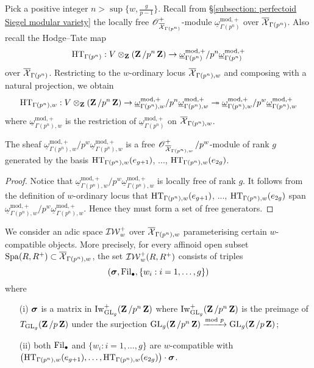 Pick a positive integer $n>\sup\{w, \frac{g}{p-1}\}$. Recall from \S \ref{subsection: perfectoid Siegel modular variety} the locally free $\operatorname{\mathscr{O}}^+_{\overline{\operatorname{\mathcal{X}}}_{\Gamma(p^n)}}$-module $\underline{\omega}^{\mathrm{mod},+}_{\Gamma(p^n)}$ over $\overline{\operatorname{\mathcal{X}}}_{\Gamma(p^n)}$. Also recall the Hodge--Tate map
$$\operatorname{HT}_{\Gamma(p^n)}:V\otimes_{\operatorname{\mathbf{Z}}}(\operatorname{\mathbf{Z}}/p^n\operatorname{\mathbf{Z}})\rightarrow \underline{\omega}^{\mathrm{mod}, +}_{\Gamma(p^n)}/p^n\underline{\omega}^{\mathrm{mod}, +}_{\Gamma(p^n)}$$
over $\overline{\operatorname{\mathcal{X}}}_{\Gamma(p^n)}$. Restricting to the $w$-ordinary locus $\overline{\operatorname{\mathcal{X}}}_{\Gamma(p^n),w}$ and composing with a natural projection, we obtain
$$\operatorname{HT}_{\Gamma(p^n),w}:V\otimes_{\operatorname{\mathbf{Z}}}(\operatorname{\mathbf{Z}}/p^n\operatorname{\mathbf{Z}})\rightarrow \underline{\omega}^{\mathrm{mod}, +}_{\Gamma(p^n),w}/p^n\underline{\omega}^{\mathrm{mod}, +}_{\Gamma(p^n),w}\twoheadrightarrow \underline{\omega}^{\mathrm{mod}, +}_{\Gamma(p^n),w}/p^w\underline{\omega}^{\mathrm{mod}, +}_{\Gamma(p^n),w}$$
where $\underline{\omega}^{\mathrm{mod}, +}_{\Gamma(p^n),w}$ is the restriction of $\underline{\omega}^{\mathrm{mod}, +}_{\Gamma(p^n)}$ on $\overline{\operatorname{\mathcal{X}}}_{\Gamma(p^n),w}$.

\begin{Lemma}
The sheaf $\underline{\omega}^{\mathrm{mod}, +}_{\Gamma(p^n),w}/p^w\underline{\omega}^{\mathrm{mod}, +}_{\Gamma(p^n),w}$ is a free $\operatorname{\mathscr{O}}^+_{\overline{\operatorname{\mathcal{X}}}_{\Gamma(p^n),w}}/p^w$-module of rank $g$ generated by the basis $\operatorname{HT}_{\Gamma(p^n),w}(e_{g+1})$, ..., $\operatorname{HT}_{\Gamma(p^n),w}(e_{2g})$.
\end{Lemma}

\begin{proof}
Notice that $\underline{\omega}^{\mathrm{mod}, +}_{\Gamma(p^n),w}/p^w\underline{\omega}^{\mathrm{mod}, +}_{\Gamma(p^n),w}$ is locally free of rank $g$. It follows from the definition of $w$-ordinary locus that $\operatorname{HT}_{\Gamma(p^n),w}(e_{g+1})$, ..., $\operatorname{HT}_{\Gamma(p^n),w}(e_{2g})$ span $\underline{\omega}^{\mathrm{mod}, +}_{\Gamma(p^n),w}/p^w\underline{\omega}^{\mathrm{mod}, +}_{\Gamma(p^n),w}$. Hence they must form a set of free generators.
\end{proof}

We consider an adic space $\operatorname{\mathcal{IW}}^+_w$ over $\overline{\operatorname{\mathcal{X}}}_{\Gamma(p^n),w}$ parameterising certain $w$-compatible objects. More precisely, for every affinoid open subset $\operatorname{Spa}(R, R^+)\subset \overline{\operatorname{\mathcal{X}}}_{\Gamma(p^n),w}$, the set $\operatorname{\mathcal{IW}}^+_w(R, R^+)$ consists of triples $$(\operatorname{\boldsymbol{\sigma}}, \operatorname{Fil}_{\bullet}, \{w_i: i=1, \ldots, g\})$$ where 
\begin{enumerate}
\item[(i)] $\operatorname{\boldsymbol{\sigma}}$ is a matrix in $\operatorname{Iw}^+_{\operatorname{GL}_g}(\operatorname{\mathbf{Z}}/p^n\operatorname{\mathbf{Z}})$ where $\operatorname{Iw}^+_{\operatorname{GL}_g}(\operatorname{\mathbf{Z}}/p^n\operatorname{\mathbf{Z}})$ is the preimage of $T_{\operatorname{GL}_g}(\operatorname{\mathbf{Z}}/p\operatorname{\mathbf{Z}})$ under the surjection $\operatorname{GL}_g(\operatorname{\mathbf{Z}}/p^n\operatorname{\mathbf{Z}})\xrightarrow[]{\mathrm{mod}\,\,p} \operatorname{GL}_g(\operatorname{\mathbf{Z}}/p\operatorname{\mathbf{Z}})$; 
\item[(ii)] both $\operatorname{Fil}_{\bullet}$ and $\{w_i: i=1, \ldots, g\}$ are $w$-compatible with $\left(\operatorname{HT}_{\Gamma(p^n),w}(e_{g+1}),\ldots, \operatorname{HT}_{\Gamma(p^n),w}(e_{2g})\right) \cdot\operatorname{\boldsymbol{\sigma}}$.
\end{enumerate}

